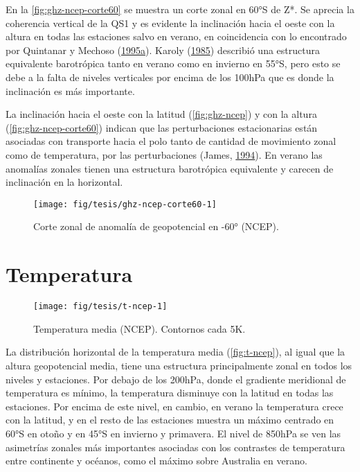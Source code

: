 \documentclass[spanish,a4paper,12pt]{book}
\begin{document}
En la \autoref{fig:ghz-ncep-corte60} se muestra un corte zonal en 60°S
de Z*. Se aprecia la coherencia vertical de la QS1 y es evidente la
inclinación hacia el oeste con la altura en todas las estaciones salvo
en verano, en coincidencia con lo encontrado por Quintanar y Mechoso
(\protect\hyperlink{ref-Quintanar1995a}{1995}\protect\hyperlink{ref-Quintanar1995a}{a}).
Karoly (\protect\hyperlink{ref-Karoly1985}{1985}) describió una
estructura equivalente barotrópica tanto en verano como en invierno en
55°S, pero esto se debe a la falta de niveles verticales por encima de
los 100hPa que es donde la inclinación es más importante.

La inclinación hacia el oeste con la latitud (\autoref{fig:ghz-ncep}) y
con la altura (\autoref{fig:ghz-ncep-corte60}) indican que las
perturbaciones estacionarias están asociadas con transporte hacia el
polo tanto de cantidad de movimiento zonal como de temperatura, por las
perturbaciones (James, \protect\hyperlink{ref-James}{1994}). En verano
las anomalías zonales tienen una estructura barotrópica equivalente y
carecen de inclinación en la horizontal.

\begin{figure*}
\texttt{[image: fig/tesis/ghz-ncep-corte60-1]} \caption{Corte zonal de anomalía de geopotencial en -60° (NCEP).}\label{fig:ghz-ncep-corte60}
\end{figure*}

\section{Temperatura}\label{temperatura}

\begin{landscape}\begin{figure}

{\centering \texttt{[image: fig/tesis/t-ncep-1]} 

}

\caption{Temperatura media (NCEP). Contornos cada 5K.}\label{fig:t-ncep}
\end{figure}
\end{landscape}

La distribución horizontal de la temperatura media
(\autoref{fig:t-ncep}), al igual que la altura geopotencial media, tiene
una estructura principalmente zonal en todos los niveles y estaciones.
Por debajo de los 200hPa, donde el gradiente meridional de temperatura
es mínimo, la temperatura disminuye con la latitud en todas las
estaciones. Por encima de este nivel, en cambio, en verano la
temperatura crece con la latitud, y en el resto de las estaciones
muestra un máximo centrado en 60°S en otoño y en 45°S en invierno y
primavera. El nivel de 850hPa se ven las asimetrías zonales más
importantes asociadas con los contrastes de temperatura entre continente
y océanos, como el máximo sobre Australia en verano.
\end{document}
